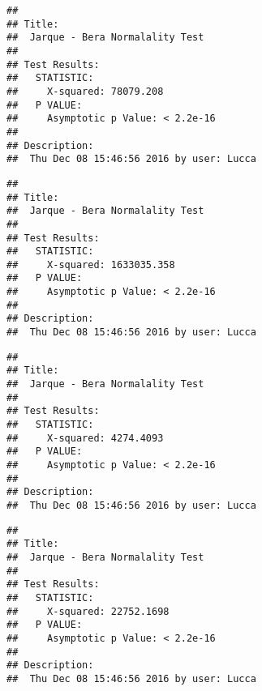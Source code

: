\documentclass[]{article}
\newenvironment{Shaded}{\begin{snugshade}}{\end{snugshade}}
\newcommand{\KeywordTok}[1]{\textcolor[rgb]{0.13,0.29,0.53}{\textbf{{#1}}}}
\newcommand{\NormalTok}[1]{{#1}}
\begin{document}
\begin{Shaded}
\end{Shaded}

\begin{verbatim}
## 
## Title:
##  Jarque - Bera Normalality Test
## 
## Test Results:
##   STATISTIC:
##     X-squared: 78079.208
##   P VALUE:
##     Asymptotic p Value: < 2.2e-16 
## 
## Description:
##  Thu Dec 08 15:46:56 2016 by user: Lucca
\end{verbatim}

\begin{Shaded}
\end{Shaded}

\begin{verbatim}
## 
## Title:
##  Jarque - Bera Normalality Test
## 
## Test Results:
##   STATISTIC:
##     X-squared: 1633035.358
##   P VALUE:
##     Asymptotic p Value: < 2.2e-16 
## 
## Description:
##  Thu Dec 08 15:46:56 2016 by user: Lucca
\end{verbatim}

\begin{Shaded}
\end{Shaded}

\begin{verbatim}
## 
## Title:
##  Jarque - Bera Normalality Test
## 
## Test Results:
##   STATISTIC:
##     X-squared: 4274.4093
##   P VALUE:
##     Asymptotic p Value: < 2.2e-16 
## 
## Description:
##  Thu Dec 08 15:46:56 2016 by user: Lucca
\end{verbatim}

\begin{Shaded}
\end{Shaded}

\begin{verbatim}
## 
## Title:
##  Jarque - Bera Normalality Test
## 
## Test Results:
##   STATISTIC:
##     X-squared: 22752.1698
##   P VALUE:
##     Asymptotic p Value: < 2.2e-16 
## 
## Description:
##  Thu Dec 08 15:46:56 2016 by user: Lucca
\end{verbatim}
\end{document}
